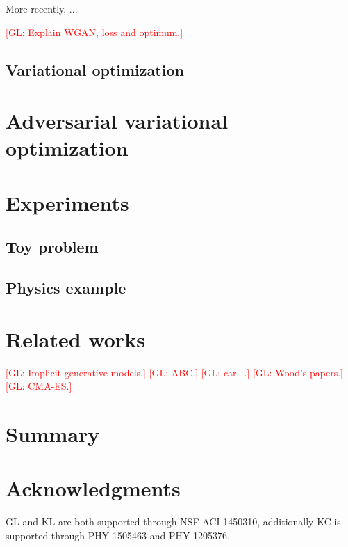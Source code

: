 \documentclass[twocolumn,superscriptaddress,aps]{revtex4-1}
\newcommand{\glnote}[1]{\textcolor{red}{[GL: #1]}}
\theoremstyle{plain}
\begin{document}
More recently, ...

\glnote{Explain WGAN, loss and optimum.}

\subsection{Variational optimization}



\section{Adversarial variational optimization}



\section{Experiments}

\subsection{Toy problem}

\subsection{Physics example}



\section{Related works}


\glnote{Implicit generative models.}
\glnote{ABC.}
\glnote{carl~\citep{cranmer2015approximating}.}
\glnote{Wood's papers.}
\glnote{CMA-ES.}



\section{Summary}




\section*{Acknowledgments}

GL and KL are both supported through NSF ACI-1450310, additionally KC is
supported through PHY-1505463 and PHY-1205376.





\end{document}
